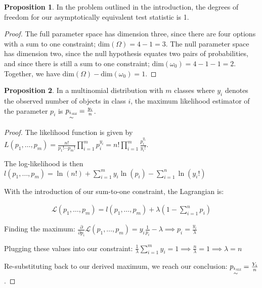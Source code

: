 \documentclass[12pt, letterpaper]{article}
\theoremstyle{definition}
\newtheorem{prop}{Proposition}[theorem]
\numberwithin{equation}{section}
\newcommand{\+}[1]{+_{\scalebox{.375}{#1}}}
\newcommand{\1}{\mathbbm{1}}
\begin{document}
\begin{prop}\label{prop.df}
	In the problem outlined in the introduction, the degrees of freedom for our asymptotically equivalent test statistic is 1.
	
	\begin{proof}
		The full parameter space has dimension three, since there are four options with a sum to one constraint; $\text{dim}(\Omega)=4-1=3$. The null parameter space has dimension two, since the null hypothesis equates two pairs of probabilities, and since there is still a sum to one constraint; $\text{dim}(\omega_0)=4-1-1=2$. Together, we have $\text{dim}(\Omega)-\text{dim}(\omega_0)=1$.
	\end{proof}
\end{prop}






\begin{prop}\label{prop.multinomialmle}
	In a multinomial distribution with $m$ classes where $y_i$ denotes the observed number of objects in class $i$, the maximum likelihood estimator of the parameter $p_i$ is $\underset{\sim}{{p_i}_{\scalebox{.35}{MLE}}}=\frac{y_i}{n}$.
	
	\begin{proof}
		The likelihood function is given by $L(p_1, \dots, p_m)=\frac{n!}{p_1! \cdots p_m!} \prod\limits_{i=1}^{m} p_i^{y_i}=n!\prod\limits_{i=1}^{m} \frac{p_i^{y_i}}{y_i!}$.\vspace{0.25cm}
		
		The log-likelihood is then $l(p_1, \dots, p_m)=\ln(n!)+\sum\limits_{i=1}^{m}y_i\ln(p_i)-\sum\limits_{i=1}^{n}\ln(y_i!)$
		
		With the introduction of our sum-to-one constraint, the Lagrangian is:
		
		\vspace{-0.5cm}
		\begin{align*}
			\mathcal{L}(p_1, \dots, p_m)=l(p_1, \dots, p_m)+\lambda(1-\sum\limits_{i=1}^{n}p_i)
		\end{align*}
		
		
		Finding the maximum: $\frac{\partial}{\partial p_i} \mathcal{L}(p_1, \dots, p_m)=y_i\frac{1}{p_i}-\lambda \implies p_i=\frac{y_i}{\lambda}$
		\vspace{\baselineskip}
		
		Plugging these values into our constraint: $ \frac{1}{\lambda}\sum\limits_{i=1}^{m}y_i=1 \implies \frac{n}{\lambda}=1 \implies \lambda=n$
		\vspace{\baselineskip}
		
		Re-substituting back to our derived maximum, we reach our conclusion: $\underset{\sim}{{p_i}_{\scalebox{0.35}{MLE}}}=\frac{Y_i}{n}$.
		
	\end{proof}
\end{prop}
\end{document}
